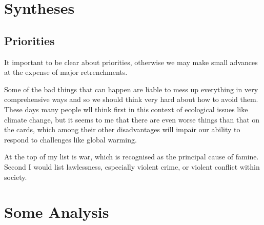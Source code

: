 \documentclass[14pt,titlepage]{extarticle}
\begin{document}
\section{Syntheses}

\subsection{Priorities}

It important to be clear about priorities, otherwise we may make small advances at the expense of major retrenchments.

Some of the bad things that can happen are liable to mess up everything in very comprehensive ways and so we should think very hard about how to avoid them.
These days many people wll think first in this context of ecological issues like climate change, but it seems to me that there are even worse things than that on the cards, which among their other disadvantages will impair our ability to respond to challenges like global warming.

At the top of my list is war, which is recognised as the principal cause of famine.
Second I would list lawlessness, especially violent crime, or violent conflict within society.

\section{Some Analysis}

%
%






\end{document}
